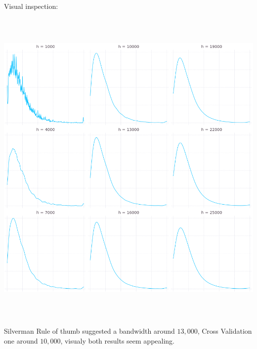 \documentclass{article}
\begin{document}
Visual inspection:

\begin{center}
\includegraphics[width=16cm, height=16cm]{Q4-c.png}
\end{center}

Silverman Rule of thumb suggested a bandwidth around $13,000$, Cross Validation one
around $10,000$, visualy both results seem appealing.
\end{document}
